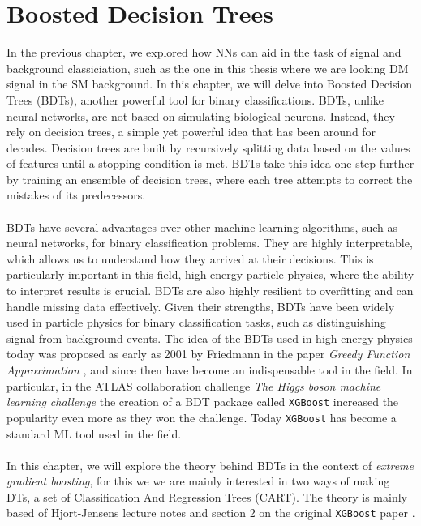 \documentclass[12pt, a4paper]{book}
\begin{document}
\clearpage




\section{Boosted Decision Trees}
In the previous chapter, we explored how NNs can aid in the task of signal and background classiciation, such as the one in this thesis where we are looking DM signal in the SM background. In this chapter, we will delve into Boosted Decision Trees (BDTs), 
another powerful tool for binary classifications. BDTs, unlike neural networks, are not based on simulating biological neurons. Instead, they rely on decision trees, a simple yet powerful idea that has been around for decades. \cite{Morgan1963ProblemsIT, ID3_BDT} 
Decision trees are built by recursively splitting data based on the values of features until a stopping condition is met. BDTs take this idea one step further by training an ensemble of decision trees, where each tree attempts to correct the mistakes of its predecessors.\\
\\BDTs have several advantages over other machine learning algorithms, such as neural networks, for binary classification problems. They are highly interpretable, which allows us to understand how they arrived at their decisions. This is particularly important in this field, 
high energy particle physics, where the ability to interpret results is crucial. BDTs are also highly resilient to overfitting and can handle missing data effectively. Given their strengths, BDTs have been widely used in particle physics for binary classification tasks, 
such as distinguishing signal from background events. The idea of the BDTs used in high energy physics today was proposed as early as 2001 by Friedmann in the paper \textit{Greedy Function Approximation} \cite{BDT_Friedman}, and since then have become an indispensable tool in the field. 
In particular, in the ATLAS collaboration challenge \textit{The Higgs boson machine learning challenge} \cite{HiggsChallenge} the creation of a BDT package called \verb|XGBoost| \cite{XGBoost} increased the popularity even more as they won the challenge. 
Today \verb|XGBoost| has become a standard ML tool used in the field.\\
\\In this chapter, we will explore the theory behind BDTs in the context of \textit{extreme gradient boosting}, for this we we are mainly interested in two ways of making DTs, a set of Classification And Regression Trees (CART). 
The theory is mainly based of Hjort-Jensens lecture notes \cite{MORTYY4, MORTYY5} and section 2 on the original \verb|XGBoost| paper \cite{XGBoost}.
\end{document}
